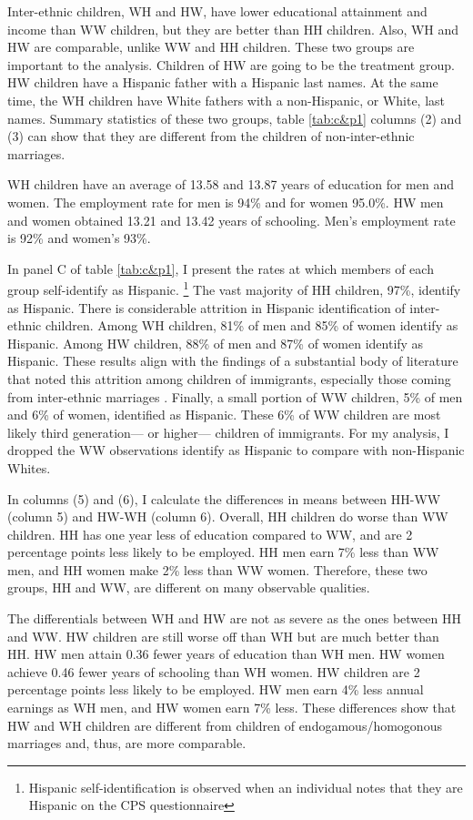 \documentclass{wptemp}
\begin{document}
Inter-ethnic children, WH and HW, have lower educational attainment and income than WW children, but they are better than HH children. Also, WH and HW are comparable, unlike WW and HH children. These two groups are important to the analysis. Children of HW are going to be the treatment group. HW children have a Hispanic father with a Hispanic last names. At the same time, the WH children have White fathers with a non-Hispanic, or White, last names. Summary statistics of these two groups, table \ref{tab:c&p1} columns (2) and (3) can show that they are different from the children of non-inter-ethnic marriages. 


WH children have an average of 13.58 and 13.87 years of education for men and women. The employment rate for men is 94\% and for women 95.0\%. HW men and women obtained 13.21 and 13.42 years of schooling. Men's employment rate is 92\% and women's 93\%.

In panel C of table \ref{tab:c&p1}, I present the rates at which members of each group self-identify as Hispanic. \footnote{Hispanic self-identification is observed when an individual notes that they are Hispanic on the CPS questionnaire} The vast majority of HH children, 97\%, identify as Hispanic. There is considerable attrition in Hispanic identification of inter-ethnic children. Among WH children, 81\% of men and 85\% of women identify as Hispanic. Among HW children, 88\% of men and 87\% of women identify as Hispanic. These results align with the findings of a substantial body of literature that noted this attrition among children of immigrants, especially those coming from inter-ethnic marriages \citep{duncan2017complexity, duncan2018identifying, duncan2020new, antman2020ethnic}. Finally, a small portion of WW children, 5\% of men and 6\% of women, identified as Hispanic. These 6\% of WW children are most likely third generation--- or higher--- children of immigrants. For my analysis, I dropped the WW observations identify as Hispanic to compare with non-Hispanic Whites.

In columns (5) and (6), I calculate the differences in means between HH-WW (column 5) and HW-WH (column 6). Overall, HH children do worse than WW children. HH has one year less of education compared to WW, and are 2 percentage points less likely to be employed. HH men earn 7\% less than WW men, and HH women make 2\% less than WW women. Therefore, these two groups, HH and WW, are different on many observable qualities.

The differentials between WH and HW are not as severe as the ones between HH and WW. HW children are still worse off than WH but are much better than HH. HW men attain 0.36 fewer years of education than WH men. HW women achieve 0.46 fewer years of schooling than WH women. HW children are 2 percentage points less likely to be employed. HW men earn 4\% less annual earnings as WH men, and HW women earn 7\% less. These differences show that HW and WH children are different from children of endogamous/homogonous marriages and, thus, are more comparable.
\end{document}
